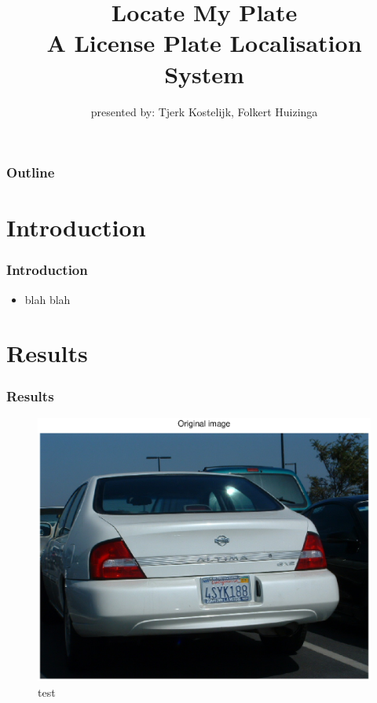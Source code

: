 \documentclass{beamer}
\title{Locate My Plate \\ A License Plate Localisation System}
\subtitle{presented by: Tjerk Kostelijk, Folkert Huizinga}
\date{}
\begin{document}
\frame{\titlepage}

\setcounter{tocdepth}{1}

\frame
{
  \frametitle{Outline}
  \small
  \tableofcontents
  \normalsize
}

\setcounter{tocdepth}{2}

\section{Introduction}
\frame
{
  \frametitle{Introduction}
	
  \begin{itemize}
  \item <+-| alert@+> blah blah 
  \end{itemize}
}

\section{Results}
\frame
{
  \frametitle{Results}
	\begin{figure}[!ht]
	\centering
	\includegraphics[width=18cm]{../report/img/cascader_original_image}
	\caption{test}
	\label{fig:cascader_original}
	\end{figure}
}
\end{document}

